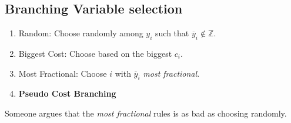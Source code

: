 \subsection{Branching Variable selection}\label{subsec:branching-variable-selection}
\begin{enumerate}
	\item Random: Choose randomly among \(y_{i}\) such that \(\overline{y}_{i}\notin\mathbb{Z}\).
	\item Biggest Cost: Choose based on the biggest \(c_{i}\).
	\item Most Fractional: Choose \(i\) with \(\overline{y}_{i}\) \emph{most fractional}.
	\item \textbf{Pseudo Cost Branching}
\end{enumerate}

\begin{note}
	Someone argues that the \emph{most fractional} rules is as bad as choosing randomly.
\end{note}
